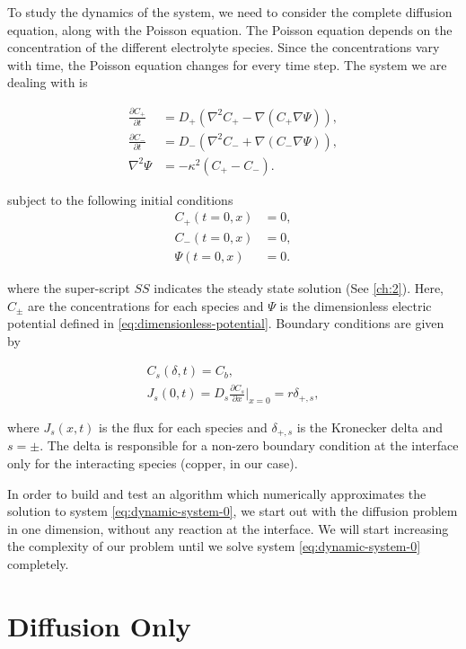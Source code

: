 \label{ch:3}
To study the dynamics of the system, we need to consider the complete diffusion equation, along with the Poisson equation. The Poisson equation depends on the concentration of the different electrolyte species. Since the concentrations vary with time, the Poisson equation changes for every time step. The system we are dealing with is

\begin{align}
\frac{\partial C_+}{\partial t} &= D_+ \left(\nabla^2 C_+ -  \nabla (C_+ \nabla \Psi) \right) , \\
\frac{\partial C_-}{\partial t} &= D_- \left(\nabla^2 C_- + \nabla (C_- \nabla \Psi) \right), \\
\nabla^2 \Psi &= -\kappa^2 \left(C_+ - C_- \right).
\label{eq:dynamic-system-0}
\end{align}

subject to the following initial conditions
\begin{align}
C_+(t = 0, x) & = 0,\\
C_-(t = 0, x) & =  0,\\
\Psi(t = 0, x) &= 0.
\end{align}

where the super-script $SS$ indicates the steady state solution (See \ref{ch:2}). Here, $C_\pm$ are the concentrations for each species and $\Psi$ is the dimensionless electric potential defined in \ref{eq:dimensionless-potential}. Boundary conditions are given by

\begin{align}
\label{eq:1d-bondary}
C_s(\delta, t) = C_b,\\
J_s(0,t) = D_s\frac{\partial C_s}{\partial x}\big|_{x=0} = r\delta_{+,s},
\label{eq:diffusion-bc}
\end{align}

where $J_s(x,t)$ is the flux for each species and $\delta_{+,s}$ is the Kronecker delta and $s = \pm$. The delta is responsible for a non-zero boundary condition at the interface only for the interacting species (copper, in our case).

In order to build and test an algorithm which numerically approximates the solution to system \ref{eq:dynamic-system-0}, we start out with the diffusion problem in one dimension, without any reaction at the interface. We will start increasing the complexity of our problem until we solve system \ref{eq:dynamic-system-0} completely.

\section{Diffusion Only}

